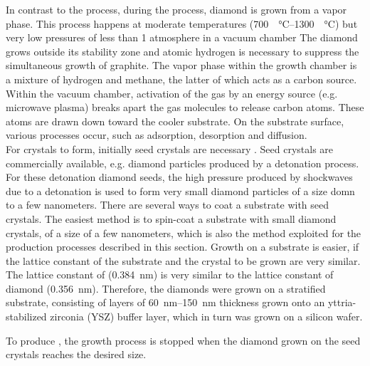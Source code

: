	In contrast to the \HPHT process,  during the \cvd process, diamond is grown from a vapor phase.
	This process happens at moderate temperatures (\SIrange{700}{1300}{\degrees\celsius}) but very low pressures of less than 1 atmosphere in a vacuum chamber \cite{}
	The diamond grows outside its stability zone and atomic hydrogen is necessary to suppress the simultaneous growth of graphite.
	The vapor phase within the growth chamber is a mixture of hydrogen and methane, the latter of which acts as a carbon source.
	Within the vacuum chamber, activation of the gas by an energy source (e.g. microwave plasma) breaks apart the gas molecules to release carbon atoms. 
	These atoms are drawn down toward the cooler substrate.
	On the substrate surface, various processes occur, such as adsorption, desorption and diffusion.
	\\
	For crystals to form, initially seed crystals are necessary .
	Seed crystals are commercially available, e.g. diamond particles produced by a detonation process.
	For these detonation diamond seeds, the high pressure produced by shockwaves due to a detonation is used to form very small diamond particles of a size domn to a few nanometers.
	There are several ways to coat a substrate with seed crystals. 
	The easiest method is to spin-coat a substrate with small diamond crystals, of a size of a few nanometers, which is also the method exploited for the production processes described in this section.
	Growth on a substrate is easier, if the lattice constant of the substrate and the crystal to be grown are very similar.
	The lattice constant of \ir (\SI{0.384}{nm}\cite{Arblaster2010}) is very similar to the lattice constant of diamond (\SI{0.356}{nm}\cite{Davis1993}).
	Therefore, the diamonds were grown on a stratified substrate, consisting of \ir layers of \SIrange{60}{150}{nm} thickness grown onto an yttria-stabilized zirconia (YSZ) buffer layer, which in turn was grown on a silicon wafer.


	To produce \nds, the growth process is stopped when the diamond grown on the seed crystals reaches the desired size. 

